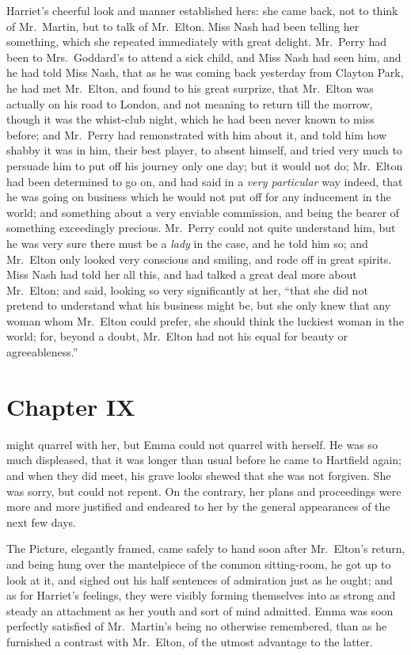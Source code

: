 Harriet's cheerful look and manner established hers: she came back,
not to think of Mr.\ Martin, but to talk of Mr.\ Elton.  Miss Nash
had been telling her something, which she repeated immediately
with great delight.  Mr.\ Perry had been to Mrs.\ Goddard's to attend
a sick child, and Miss Nash had seen him, and he had told Miss Nash,
that as he was coming back yesterday from Clayton Park, he had met
Mr.\ Elton, and found to his great surprize, that Mr.\ Elton was
actually on his road to London, and not meaning to return till
the morrow, though it was the whist-club night, which he had been
never known to miss before; and Mr.\ Perry had remonstrated with him
about it, and told him how shabby it was in him, their best player,
to absent himself, and tried very much to persuade him to put off
his journey only one day; but it would not do; Mr.\ Elton had been
determined to go on, and had said in a \emph{very particular} way indeed,
that he was going on business which he would not put off for any
inducement in the world; and something about a very enviable commission,
and being the bearer of something exceedingly precious.  Mr.\ Perry
could not quite understand him, but he was very sure there must
be a \emph{lady} in the case, and he told him so; and Mr.\ Elton only
looked very conscious and smiling, and rode off in great spirits.
Miss Nash had told her all this, and had talked a great deal more
about Mr.\ Elton; and said, looking so very significantly at her,
``that she did not pretend to understand what his business might be,
but she only knew that any woman whom Mr.\ Elton could prefer,
she should think the luckiest woman in the world; for, beyond a doubt,
Mr.\ Elton had not his equal for beauty or agreeableness.''



\chapter{Chapter IX}


 might quarrel with her, but Emma could not quarrel
with herself.  He was so much displeased, that it was longer than
usual before he came to Hartfield again; and when they did meet,
his grave looks shewed that she was not forgiven.  She was sorry,
but could not repent.  On the contrary, her plans and proceedings
were more and more justified and endeared to her by the general
appearances of the next few days.

The Picture, elegantly framed, came safely to hand soon after
Mr.\ Elton's return, and being hung over the mantelpiece of the common
sitting-room, he got up to look at it, and sighed out his half sentences
of admiration just as he ought; and as for Harriet's feelings, they were
visibly forming themselves into as strong and steady an attachment
as her youth and sort of mind admitted.  Emma was soon perfectly
satisfied of Mr.\ Martin's being no otherwise remembered, than as
he furnished a contrast with Mr.\ Elton, of the utmost advantage to the latter.

